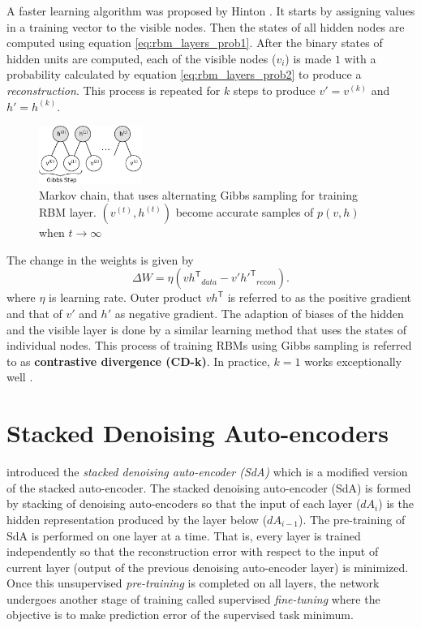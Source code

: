 A faster learning algorithm was proposed by Hinton \cite{hinton2002training,hinton2006reducing,hinton2010practical}. It starts by assigning values in a training vector to the visible nodes. Then the states of all hidden nodes are computed using equation \ref{eq:rbm_layers_prob1}. After the binary states of hidden units are computed, each of the visible nodes ($v_i$) is made $1$ with a probability calculated by equation \ref{eq:rbm_layers_prob2} to produce a \textit{reconstruction}. This process is repeated for $k$ steps to produce $v'= v^{(k)}$ and $h' = h^{(k)}$. 

\begin{figure}[ht]
\centering
\includegraphics[width=0.3\textwidth]{./imgs/markov_chain.png}
\caption[Markov chain of training RBM layer]{Markov chain, that uses alternating Gibbs sampling for training RBM layer. $(v^{(t)}, h^{(t)})$ become accurate samples of $p(v,h)$ when $t \rightarrow \infty$}
\label{fig:rbmmarkovChain}
\end{figure}

The change in the weights is given by
$$ \Delta W = \eta ({vh^\mathsf{T}}_{data} - {v'h'^{\mathsf{T}}}_{recon}). $$
where $\eta$ is learning rate. Outer product $vh^\mathsf{T}$ is referred to as the positive gradient and that of $v'$ and $h'$ as negative gradient. The adaption of biases of the hidden and the visible layer is done by a similar learning method that uses the states of individual nodes. This process of training RBMs using Gibbs sampling is referred to as \textbf{contrastive divergence (CD-k)}. In practice, $k=1$ works exceptionally well \cite{hinton2010practical}.

\section{Stacked Denoising Auto-encoders}
\citet{vincent2010stacked} introduced the \emph{stacked denoising auto-encoder (SdA)} which is a modified version of the stacked auto-encoder. The stacked denoising auto-encoder (SdA) is formed by stacking of denoising auto-encoders so that the input of each layer ($dA_i$) is the hidden representation produced by the layer below ($dA_{i-1}$). The pre-training of SdA is performed on one layer at a time. That is, every layer is trained independently so that the reconstruction error with respect to the input of current layer (output of the previous denoising auto-encoder layer) is minimized. Once this unsupervised \textit{pre-training} is completed on all layers, the network undergoes another stage of training called supervised \textit{fine-tuning} where the objective is to make prediction error of the supervised task minimum.

